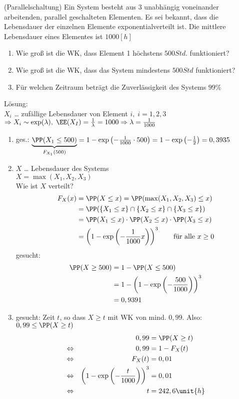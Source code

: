 \documentclass{scrreprt}
\renewenvironment{anumerate}{\begin{enumerate}[label=(\alph*)]}{\end{enumerate}} %
\begin{document}
 (Parallelschaltung) Ein System besteht aus 3 unabhängig voneinander arbeitenden, parallel geschalteten Elementen. Es sei bekannt, dass die Lebensdauer der einzelnen Elemente exponentialverteilt ist. Die mittlere Lebensdauer eines Elementes ist $ 1000\unit{[h]} $
\begin{anumerate}
	\item Wie groß ist die WK, dass Element 1 höchstens $ 500\unit{Std.} $ funktioniert?
	\item Wie groß ist die WK, dass das System mindestens $ 500 \unit{Std} $ funktioniert?
	\item Für welchen Zeitraum beträgt die Zuverlässigkeit des Systems $ 99\% $
\end{anumerate}
Lösung:\\
$ X_i $ … zufällige Lebensdauer von Element $ i, \; i=1,2,3 $\\
$ \Rightarrow X_i \sim \exp(\lambda), \; \EE(X_I)=\frac{1}{\lambda}=1000 \Rightarrow \lambda=\frac{1}{1000} $
\begin{anumerate}
	\item ges.: $ \underbrace{\PP(X_1 \leq 500)}_{F_{X_1}(500)} = 1-\exp\left(-\frac{1}{1000}\cdot 500\right)=1-\exp\left(-\frac{1}{2}\right) = 0,3935 $
	\item $ X $ … Lebensdauer des Systems\\
	$ X=\max(X_1,X_2,X_3) $\\
	Wie ist $ X $ verteilt?
	\begin{align*}
	F_X(x)&=\PP(X\leq x)=\PP(\max(X_1,X_2,X_3)\leq x)\\
	&=\PP(\{X_1 \leq x\} \cap \{X_2 \leq x\} \cap \{X_3 \leq x\} )\\
	&=\PP(X_1 \leq x) \cdot \PP(X_2 \leq x) \cdot \PP(X_3 \leq x)\\
	&= \left(1-\exp\left(-\frac{1}{1000}x\right)\right)^3 \qquad \text{für alle }x\geq 0
	\end{align*}
	gesucht: 
	\begin{align*}
	\PP(X\geq 500) &= 1-\PP(X\leq 500)\\
	&=1-\left(1-\exp\left(-\frac{500}{1000}\right)\right)^3\\
	&=0,9391
	\end{align*}
	\item gesucht: Zeit $ t $, so dass $ X\geq t $ mit WK von mind. $ 0,99 $. Also: $ 0,99 \leq \PP(X\geq t) $
	\begin{align*}
	&&0,99 &= \PP(X\geq t)\\
	\Leftrightarrow&& 0,99 &= 1-F_X (t)\\
	\Leftrightarrow&& F_X(t) &= 0,01\\
	\Leftrightarrow&& \left(1-\exp\left(-\frac{t}{1000}\right)\right)^3 &=0,01\\
	\Leftrightarrow&& t &= 242,6 \unit{h}
	\end{align*}
\end{anumerate}
\end{document}
